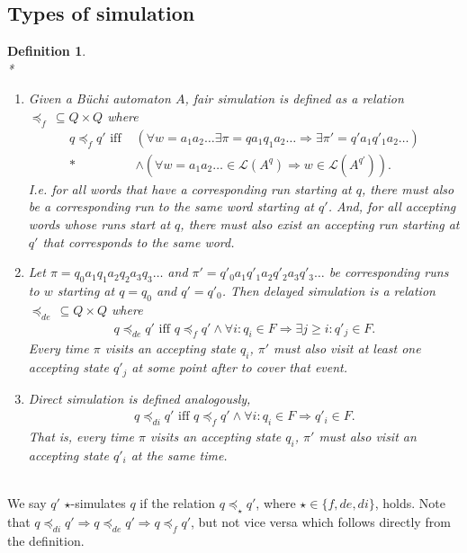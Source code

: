 \documentclass[12pt,oneside,bibliography=totoc,abstracton]{scrartcl}
\newtheorem{mydef}{Definition}
\begin{document}
\newpage

\subsection{Types of simulation}
\begin{mydef}\label{def_simulation}\quad\\*
	\begin{enumerate}
		\item Given a Büchi automaton $A$, \textnormal{fair simulation} is defined as a relation
			$\preceq_{f} \, \subseteq Q \times Q$ where
			\begin{align*}
				q \preceq_{f} q' \text{ iff } & \left(\forall w = a_1a_2 \ldots \exists \pi = qa_1q_1a_2 \ldots
						\Rightarrow \exists \pi' = q'a_1 q'_1a_2 \ldots\right)\\*
					& \land \left(\forall w = a_1a_2 \ldots \in \mathcal{L}(A^q) \Rightarrow w \in \mathcal{L}(A^{q'})\right).
			\end{align*}
			I.e. for all words that have a corresponding \textnormal{run} starting at $q$, there
			must also be a corresponding \textnormal{run} to the same word starting at $q'$.
			And, for all accepting words whose \textnormal{run}s start at $q$, there must also exist an
			accepting \textnormal{run} starting at $q'$ that corresponds to the same word.
		\item Let $\pi = q_0a_1q_1a_2q_2a_3q_3 \ldots$ and $\pi' = q'_0a_1q'_1a_2q'_2a_3q'_3 \ldots$
			be corresponding \textnormal{run}s to $w$ starting at $q = q_0$ and $q' = q'_0$.
			Then \textnormal{delayed simulation} is a relation $\preceq_{de} \, \subseteq Q \times Q$ where
			\begin{align*}
				q \preceq_{de} q' \text{ iff } q \preceq_{f} q' \land \forall i : q_i \in F \Rightarrow \exists j \ge i : q'_j \in F.
			\end{align*}
			Every time $\pi$ visits an accepting state $q_i$, $\pi'$ must also visit at least one accepting state $q'_j$
			at some point after to cover that event.
		\item \textnormal{Direct simulation} is defined analogously,
			\begin{align*}
				q \preceq_{di} q' \text{ iff } q \preceq_{f} q' \land \forall i : q_i \in F \Rightarrow q'_i \in F.
			\end{align*}
			That is, every time $\pi$ visits an accepting state $q_i$, $\pi'$ must also visit an accepting state
			$q'_i$ at the same time.
	\end{enumerate}
\end{mydef}\quad\\
We say $q'$ $\star$-simulates $q$ if the relation $q \preceq_{\star} q'$, where $\star \in \{f, de, di\}$, holds.
Note that $q \preceq_{di} q' \Rightarrow q \preceq_{de} q' \Rightarrow q \preceq_{f} q'$, but not vice versa
which follows directly from the definition.
\end{document}
